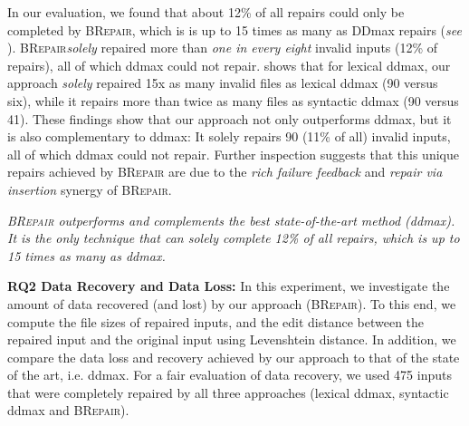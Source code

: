 \documentclass[sigconf,review,anonymous]{acmart}
\newenvironment{result}{\begin{framed}\centering\it}{\end{framed}}
\newcounter{todocounter}
\newcommand{\todo}[1]{\marginpar{$|$}\textcolor{red}{\stepcounter{todocounter}\footnote[\thetodocounter]{\textcolor{red}{\textbf{TODO }}\textit{#1}}}}
\renewcommand{\todo}[1]{}
\newcommand{\approach}{\textsc{BRepair}\xspace}
\begin{document}
In our evaluation, we found that about 12\% of all repairs could only be completed by \approach, which is is up to 15 times as many as DDmax repairs (\textit{see} ).
\approach \textit{solely} repaired more than
\textit{one in every eight} invalid inputs (12\% of repairs), %
all of which ddmax could not repair. %
 shows that for lexical ddmax, our approach \textit{solely} repaired 15x as many invalid files as lexical ddmax (90 versus six), while it repairs more than twice as many files as syntactic ddmax (90 versus 41).
These findings show that our approach not only outperforms ddmax, but it is also complementary to ddmax: It solely repairs 90 (11\% of all) invalid inputs, all of which ddmax could not repair. %
Further
inspection suggests that this unique repairs achieved by \approach are due to the \textit{rich failure feedback} and \textit{repair via insertion} synergy of \approach.



\begin{result}
\approach
outperforms and complements the best state-of-the-art method (ddmax).
It is the only technique that can solely complete 12\% of all repairs, which is up to 15 times as many as ddmax.
\end{result}

\noindent
\textbf{RQ2 Data Recovery and Data Loss:}\todo{fix discussion of \Cref{tab:data-recovery} } In this experiment, we investigate the amount of data recovered (and lost) by our approach (\approach). To this end, we compute the file sizes of repaired inputs, and the edit distance between the repaired input and the original input using Levenshtein distance. In addition, we compare the data loss and recovery achieved by our approach to that of the state of the art, i.e. ddmax.
For a fair evaluation of data recovery, we used 475 inputs that were completely repaired by all three approaches (lexical ddmax, syntactic ddmax and \approach).
\end{document}

